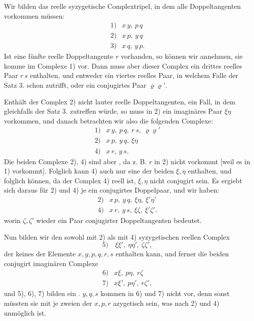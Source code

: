Wir bilden das reelle syzygetische Complextripel, in dem alle
Doppeltangenten vorkommen müssen:
\[
\begin{array}{rl}
1) & x\,y,\ p\,q \\
2) & x\,p,\ y\,q \\
3) & x\,q,\ y\,p.
\end{array}
\]
Ist eine fünfte reelle Doppeltangente $r$ vorhanden, so können wir
annehmen, sie komme im Complexe 1) vor. Dann muss aber dieser Complex
ein drittes reelles Paar $r\,s$ enthalten, und entweder ein viertes
reelles Paar, in welchem Falle der Satz 3. schon zutrifft, oder ein
conjugirtes Paar $\varrho\varrho'$.

Enthält der Complex 2) nicht lauter reelle Doppeltangenten, ein Fall,
in dem gleichfalls der Satz 3. zutreffen würde, so muss in 2) ein
imaginäres Paar $\xi\eta$ vorkommen, und danach betrachten wir also die
folgenden Complexe:
\[
\begin{array}{rl}
1) & x\,y,\ p\,q,\ r\,s,\ \varrho\varrho' \\
2) & x\,p,\ y\,q,\ \xi\eta \\
4) & x\,r,\ y\,s.
\end{array}
\]
Die beiden Complexe 2), 4) sind aber , da z. B. $r$ in 2)
nicht vorkommt [weil es in 1) vorkommt]. Folglich kann 4) auch nur
eine der beiden $\xi, \eta$ enthalten, und folglich können, da der Complex
4) reell ist, $\xi, \eta$ nicht conjugirt sein. Es ergiebt sich daraus für
2) und 4) je ein conjugirtes Doppelpaar, und wir haben:
\[
\begin{array}{rl}
2) & x\,p,\ y\,q,\ \xi\eta,\ \xi'\eta' \\
4) & x\,r,\ y\,s,\ \xi\zeta,\ \xi'\zeta'.
\end{array}
\]
worin $\zeta, \zeta'$ wieder ein Paar conjugirter Doppeltangenten bedeutet.

Nun bilden wir den sowohl mit 2) als mit 4) syzygetischen reellen
Complex
\[
5)\quad \xi\xi',\ \eta\eta',\ \zeta\zeta',
\]
der keines der Elemente $x, y, p, q, r, s$ enthalten kann, und ferner die
beiden conjugirt imaginären Complexe
\[
\begin{array}{rl}
6) & x\xi,\ p\eta,\ r\zeta \\
7) & x\xi',\ p\eta',\ r\zeta',
\end{array}
\]
und 5), 6), 7) bilden ein . $y, q, s$ kommen in 6)
und 7) nicht vor, denn sonst müssten sie mit je zweien der $x, p, r$
azygetisch sein, was nach 2) und 4) unmöglich ist.
